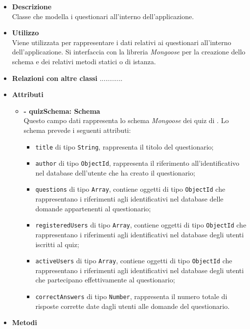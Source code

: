 \begin{itemize}
	\item \textbf{Descrizione} \\
	Classe che modella i questionari all'interno dell'applicazione.
	\item \textbf{Utilizzo} \\
	Viene utilizzata per rappresentare i dati relativi ai questionari all'interno dell'applicazione. Si interfaccia con la libreria \textit{Mongoose} per la creazione dello schema e dei relativi metodi statici o di istanza.
	\item \textbf{Relazioni con altre classi}
		............
	\item \textbf{Attributi}
		\begin{itemize}
			\item \textbf{- quizSchema: Schema} \\
			Questo campo dati rappresenta lo schema \textit{Mongoose} dei quiz di \progetto. Lo schema prevede i seguenti attributi:
				\begin{itemize}
					\item \texttt{title} di tipo \texttt{String}, rappresenta il titolo del questionario;
					\item \texttt{author} di tipo \texttt{ObjectId}, rappresenta il riferimento all'identificativo nel database dell'utente che ha creato il questionario;
					\item \texttt{questions} di tipo \texttt{Array}, contiene oggetti di tipo \texttt{ObjectId} che rappresentano i riferimenti agli identificativi nel database delle domande appartenenti al questionario;
					\item \texttt{registeredUsers} di tipo \texttt{Array}, contiene oggetti di tipo \texttt{ObjectId} che rappresentano i riferimenti agli identificativi nel database degli utenti iscritti al quiz;
					\item \texttt{activeUsers} di tipo \texttt{Array}, contiene oggetti di tipo \texttt{ObjectId} che rappresentano i riferimenti agli identificativi nel database degli utenti che partecipano effettivamente al questionario;
					\item \texttt{correctAnswers} di tipo \texttt{Number}, rappresenta il numero totale di risposte corrette date dagli utenti alle domande del questionario.	
				\end{itemize}
		\end{itemize}
	\item \textbf{Metodi}
		\begin{itemize}
		

\end{itemize}
\end{itemize}
